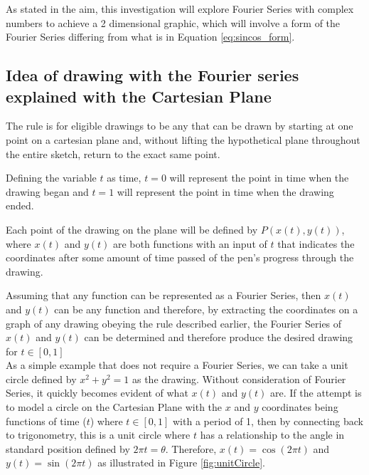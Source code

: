 \documentclass[letterpaper, 12pt]{article}
\begin{document}
As stated in the aim, this investigation will explore Fourier Series
with complex numbers to achieve a 2 dimensional graphic, which will involve
a form of the Fourier Series differing from what is in Equation \ref*{eq:sincos_form}.

\subsection{Idea of drawing with the Fourier series explained with the Cartesian Plane} \label{sec:cartplane}

The rule is for eligible drawings to be any that can be drawn by starting at one point
on a cartesian plane and, without lifting the hypothetical plane throughout the entire
sketch, return to the exact same point.

Defining the variable \(t\) as time, \(t = 0\) will represent the point in time
when the drawing began and \(t = 1\) will represent the point in time when
the drawing ended.

Each point of the drawing on the plane will be defined by \(P(x(t), y(t))\),
where \(x(t)\) and \(y(t)\) are both functions with an input of \(t\) that
indicates the coordinates after some amount of time passed of the pen's progress
through the drawing.

Assuming that any function can be represented as a Fourier Series, then
\(x(t)\) and \(y(t)\) can be any function and therefore, by extracting
the coordinates on a graph of any drawing obeying the rule described earlier,
the Fourier Series of \(x(t)\) and \(y(t)\) can be determined and therefore
produce the desired drawing for \(t\in [0,1]\)
\\

As a simple example that does not require a Fourier Series,
we can take a unit circle defined by \( x^2 + y^2 = 1 \) as the drawing.
Without consideration of Fourier Series,
it quickly becomes evident of what \(x(t)\) and \(y(t)\) are.
If the attempt is to model a circle on the Cartesian Plane
with the \(x\) and \(y\) coordinates being functions of time
(\(t\)) where \(t\in [0,1]\) with a period of 1,
then by connecting back to trigonometry, this is a unit circle
where \(t\) has a relationship to the angle in standard position
defined by \(2\pi t = \theta\). Therefore,
\(x(t) = \cos(2\pi t)\) and \(y(t) = \sin(2\pi t)\)
as illustrated in Figure \ref*{fig:unitCircle}.
\end{document}
